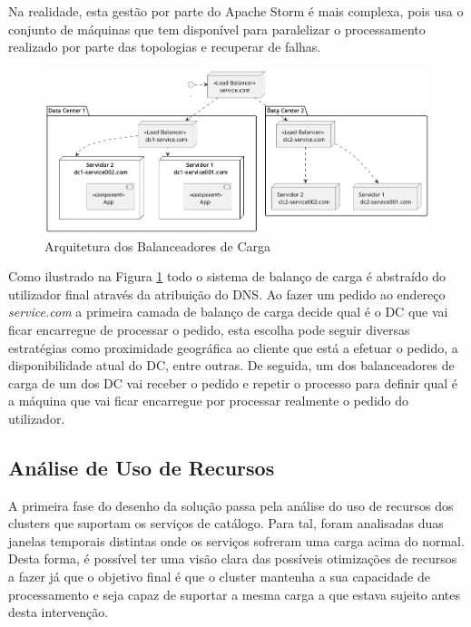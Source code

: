 Na realidade, esta gestão por parte do Apache Storm é mais complexa, pois usa o conjunto de
máquinas que tem disponível para paralelizar o processamento realizado por parte das topologias e
recuperar de falhas.

\begin{figure}[H]
  \centerline{\includegraphics[scale=0.45]{media/content/analise/lb.png}}
  \caption{Arquitetura dos Balanceadores de Carga}
  \label{lb}
\end{figure}

Como ilustrado na Figura \ref{lb} todo o sistema de balanço de carga é abstraído do utilizador
final através da atribuição do DNS. Ao fazer um pedido ao endereço \textit{service.com} a primeira
camada de balanço de carga decide qual é o \ac{DC} que vai ficar encarregue de processar o pedido,
esta escolha pode seguir diversas estratégias como proximidade geográfica ao cliente que está a 
efetuar o pedido, a disponibilidade atual do \ac{DC}, entre outras. De seguida, um dos 
balanceadores de carga de um dos \ac{DC} vai receber o pedido e repetir o processo para definir
qual é a máquina que vai ficar encarregue por processar realmente o pedido do utilizador.

\subsection{Análise de Uso de Recursos}

A primeira fase do desenho da solução passa pela análise do uso de recursos dos \glspl{cluster}
que suportam os serviços de catálogo. Para tal, foram analisadas duas janelas temporais distintas
onde os serviços sofreram uma carga acima do normal. Desta forma, é possível ter uma visão clara
das possíveis otimizações de recursos a fazer já que o objetivo final é que o \gls{cluster}
mantenha a sua capacidade de processamento e seja capaz de suportar a mesma carga a que estava
sujeito antes desta intervenção.

